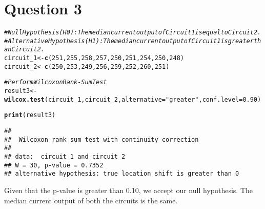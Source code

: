 \documentclass{article}\usepackage[]{graphicx}\usepackage[]{xcolor}
\makeatletter
\newcommand{\hlnum}[1]{\textcolor[rgb]{0.686,0.059,0.569}{#1}}%
\newcommand{\hlsng}[1]{\textcolor[rgb]{0.192,0.494,0.8}{#1}}%
\newcommand{\hlcom}[1]{\textcolor[rgb]{0.678,0.584,0.686}{\textit{#1}}}%
\newcommand{\hldef}[1]{\textcolor[rgb]{0.345,0.345,0.345}{#1}}%
\newcommand{\hlkwb}[1]{\textcolor[rgb]{0.69,0.353,0.396}{#1}}%
\newcommand{\hlkwc}[1]{\textcolor[rgb]{0.333,0.667,0.333}{#1}}%
\newcommand{\hlkwd}[1]{\textcolor[rgb]{0.737,0.353,0.396}{\textbf{#1}}}%
\newenvironment{kframe}{%
 \def\at@end@of@kframe{}%
 \ifinner\ifhmode%
  \def\at@end@of@kframe{\end{minipage}}%
  \begin{minipage}{\columnwidth}%
 \fi\fi%
 \def\FrameCommand##1{\hskip\@totalleftmargin \hskip-\fboxsep
 \colorbox{shadecolor}{##1}\hskip-\fboxsep
     \hskip-\linewidth \hskip-\@totalleftmargin \hskip\columnwidth}%
 \MakeFramed {\advance\hsize-\width
   \@totalleftmargin\z@ \linewidth\hsize
   \@setminipage}}%
 {\par\unskip\endMakeFramed%
 \at@end@of@kframe}
\newenvironment{knitrout}{}{} %
\makeatother
\begin{document}
\section{Question 3}
\begin{knitrout}
\color{fgcolor}\begin{kframe}
\begin{alltt}
\hlcom{# Null Hypothesis (H0): The median current output of Circuit 1 is equal to Circuit 2.}
\hlcom{# Alternative Hypothesis (H1): The median current output of Circuit 1 is greater than Circuit 2.}
\hldef{circuit_1} \hlkwb{<-} \hlkwd{c}\hldef{(}\hlnum{251}\hldef{,} \hlnum{255}\hldef{,} \hlnum{258}\hldef{,} \hlnum{257}\hldef{,} \hlnum{250}\hldef{,} \hlnum{251}\hldef{,} \hlnum{254}\hldef{,} \hlnum{250}\hldef{,} \hlnum{248}\hldef{)}
\hldef{circuit_2} \hlkwb{<-} \hlkwd{c}\hldef{(}\hlnum{250}\hldef{,} \hlnum{253}\hldef{,} \hlnum{249}\hldef{,} \hlnum{256}\hldef{,} \hlnum{259}\hldef{,} \hlnum{252}\hldef{,} \hlnum{260}\hldef{,} \hlnum{251}\hldef{)}

\hlcom{# Perform Wilcoxon Rank-Sum Test}
\hldef{result3} \hlkwb{<-} \hlkwd{wilcox.test}\hldef{(circuit_1, circuit_2,} \hlkwc{alternative} \hldef{=} \hlsng{"greater"}\hldef{,} \hlkwc{conf.level} \hldef{=} \hlnum{0.90}\hldef{)}
\end{alltt}


{\ttfamily\noindent{}}\begin{alltt}
\hlkwd{print}\hldef{(result3)}
\end{alltt}
\begin{verbatim}
## 
## 	Wilcoxon rank sum test with continuity correction
## 
## data:  circuit_1 and circuit_2
## W = 30, p-value = 0.7352
## alternative hypothesis: true location shift is greater than 0
\end{verbatim}
\end{kframe}
\end{knitrout}
Given that the p-value is greater than 0.10, we accept our null hypothesis. The median current output of both the circuits is the same.
\end{document}
